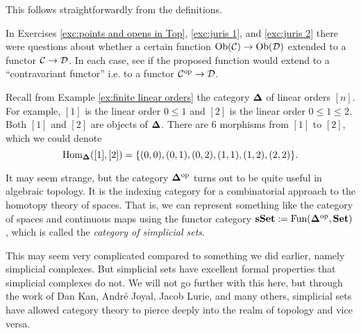 \documentclass[CT4S-EN-RU]{subfiles}
\begin{document}
\begin{lemmaRUS}
\end{lemmaRUS}

\begin{proofENG}
This follows straightforwardly from the definitions.
\end{proofENG}

\begin{proofRUS}
\end{proofRUS}

\begin{exerciseENG}
In Exercises \ref{exc:points and opens in Top}, \ref{exc:juris 1}, and \ref{exc:juris 2} there were questions about whether a certain function $\textnormal{Ob}(\mathcal{C})\rightarrow\textnormal{Ob}(\mathcal{D})$ extended to a functor $\mathcal{C}\rightarrow\mathcal{D}$. In each case, see if the proposed function would extend to a “contravariant functor” i.e. to a functor $\mathcal{C}^\textnormal{op}\rightarrow\mathcal{D}$.
\end{exerciseENG}

\begin{exerciseRUS}
\end{exerciseRUS}

\begin{exampleENG}\label{ex:simplicial set}
Recall from Example \ref{ex:finite linear orders} the category ${\bf \Delta}$ of linear orders $[n]$. For example, $[1]$ is the linear order $0\leq 1$ and $[2]$ is the linear order $0\leq 1\leq2$. Both $[1]$ and $[2]$ are objects of ${\bf \Delta}$. There are 6 morphisms from $[1]$ to $[2]$, which we could denote $$\textnormal{Hom}_{{\bf \Delta}}([1],[2])=\{(0,0), (0,1), (0,2), (1,1), (1,2), (2,2)\}.$$

It may seem strange, but the category ${\bf \Delta}^\textnormal{op}$ turns out to be quite useful in algebraic topology. It is the indexing category for a combinatorial approach to the homotopy theory of spaces. That is, we can represent something like the category of spaces and continuous maps using the functor category ${\bf sSet}:=\textnormal{Fun}({\bf \Delta}^\textnormal{op},{\bf Set})$, which is called the {\em category of simplicial sets}. 

This may seem very complicated compared to something we did earlier, namely simplicial complexes. But simplicial sets have excellent formal properties that simplicial complexes do not. We will not go further with this here, but through the work of Dan Kan, Andr\'{e} Joyal, Jacob Lurie, and many others, simplicial sets have allowed category theory to pierce deeply into the realm of topology and vice versa.
\end{exampleENG}
\end{document}
